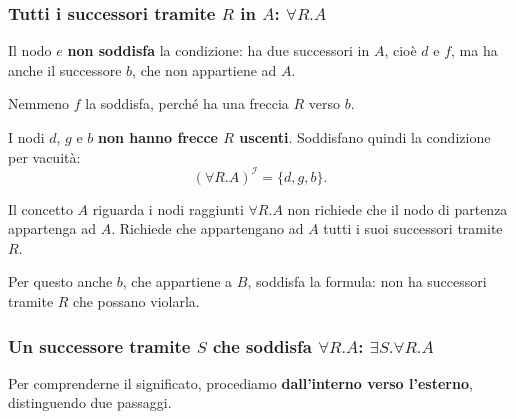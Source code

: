 \subsubsection{Tutti i successori tramite \(R\) in \(A\): \(\forall R.A\)}

Il nodo \(e\) \textbf{non soddisfa} la condizione: ha due successori in \(A\),
cioè \(d\) e \(f\), ma ha anche il successore \(b\), che non appartiene ad \(A\).

Nemmeno \(f\) la soddisfa, perché ha una freccia \(R\) verso \(b\).

I nodi \(d\), \(g\) e \(b\) \textbf{non hanno frecce \(R\) uscenti}.
Soddisfano quindi la condizione per vacuità:
\[
    (\forall R.A)^{\mathcal I}=\{d,g,b\}.
\]

\begin{warning}{Il concetto \(A\) riguarda i nodi raggiunti}
    \(\forall R.A\) non richiede che il nodo di partenza appartenga ad \(A\).
    Richiede che appartengano ad \(A\) tutti i suoi successori tramite \(R\).

    Per questo anche \(b\), che appartiene a \(B\), soddisfa la formula:
    non ha successori tramite \(R\) che possano violarla.
\end{warning}

\subsubsection{Un successore tramite \(S\) che soddisfa \(\forall R.A\): \(\exists S.\forall R.A\)}
Per comprenderne il significato, procediamo
\textbf{dall'interno verso l'esterno}, distinguendo due passaggi.


